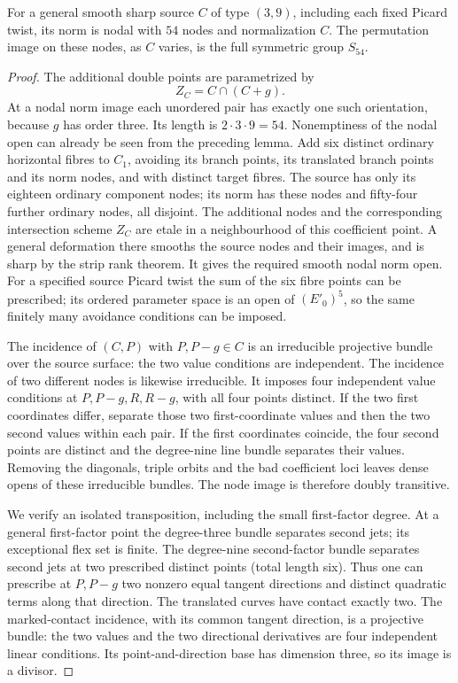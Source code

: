 \begin{lemma}
\label{lem:mixed-d3-self-node-symmetric-candidate}
For a general smooth sharp source $C$ of type $(3,9)$, including
each fixed Picard twist, its norm is nodal with $54$ nodes and
normalization $C$. The permutation image on these nodes, as
$C$ varies, is the full symmetric group $S_{54}$.
\end{lemma}
\begin{proof}
The additional double points are parametrized by
\[
                   Z_C=C\cap(C+g).
\]
At a nodal norm image each unordered pair has exactly one such
orientation, because $g$ has order three. Its length is
$2\cdot3\cdot9=54$.
Nonemptiness of the nodal open can already be seen from the
preceding lemma. Add six distinct ordinary horizontal fibres
to $C_1$, avoiding its branch points, its translated branch
points and its norm nodes, and with distinct target fibres.
The source has only its eighteen ordinary component nodes;
its norm has these nodes and fifty-four further ordinary nodes,
all disjoint. The additional nodes and the corresponding
intersection scheme $Z_C$ are etale in a neighbourhood of this
coefficient point. A general deformation there smooths the
source nodes and their images, and is sharp by the strip rank
theorem. It gives the required smooth nodal norm open. For a
specified source Picard twist the sum of the six fibre points
can be prescribed; its ordered parameter space is an open of
$(E'_0)^5$, so the same finitely many avoidance conditions can
be imposed.

The incidence of $(C,P)$ with $P,P-g\in C$ is an irreducible
projective bundle over the source surface: the two value
conditions are independent. The incidence of two different
nodes is likewise irreducible. It imposes four independent
value conditions at $P,P-g,R,R-g$, with all four points
distinct. If the two first coordinates differ, separate
those two first-coordinate values and then the two second
values within each pair. If the first coordinates coincide,
the four second points are distinct and the degree-nine line
bundle separates their values. Removing the diagonals, triple
orbits and the bad coefficient loci leaves dense opens of
these irreducible bundles. The node image is therefore doubly
transitive.

We verify an isolated transposition, including the small
first-factor degree. At a general first-factor point the
degree-three bundle separates second jets; its exceptional
flex set is finite. The degree-nine second-factor bundle
separates second jets at two prescribed distinct points
(total length six). Thus one can prescribe at $P,P-g$
two nonzero equal tangent directions and distinct quadratic
terms along that direction. The translated curves have
contact exactly two. The marked-contact incidence, with its
common tangent direction, is a projective bundle: the two
values and the two directional derivatives are four
independent linear conditions. Its point-and-direction base
has dimension three, so its image is a divisor.


\end{proof}
